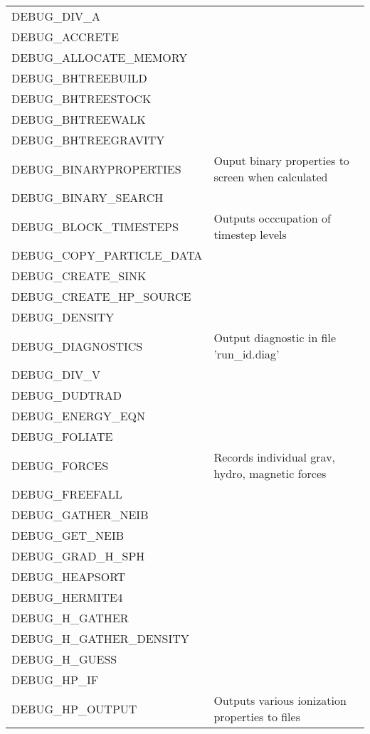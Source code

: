 \documentclass[a4paper]{article}
\begin{document}
\begin{center}
\begin{supertabular}{|p{6cm}|p{8cm}|}
DEBUG\_DIV\_A               & \\
DEBUG\_ACCRETE              & \\
DEBUG\_ALLOCATE\_MEMORY     & \\
DEBUG\_BHTREEBUILD          & \\
DEBUG\_BHTREESTOCK          & \\
DEBUG\_BHTREEWALK           & \\
DEBUG\_BHTREEGRAVITY        & \\
DEBUG\_BINARYPROPERTIES     & Ouput binary properties to screen when calculated \\
DEBUG\_BINARY\_SEARCH       & \\
DEBUG\_BLOCK\_TIMESTEPS     & Outputs occcupation of timestep levels \\
DEBUG\_COPY\_PARTICLE\_DATA & \\
DEBUG\_CREATE\_SINK         & \\
DEBUG\_CREATE\_HP\_SOURCE   & \\
DEBUG\_DENSITY              & \\
DEBUG\_DIAGNOSTICS          & Output diagnostic in file 'run\_id.diag'\\
DEBUG\_DIV\_V               & \\
DEBUG\_DUDTRAD              & \\
DEBUG\_ENERGY\_EQN          & \\
DEBUG\_FOLIATE              & \\
DEBUG\_FORCES               & Records individual grav, hydro, magnetic forces\\
DEBUG\_FREEFALL             & \\
DEBUG\_GATHER\_NEIB         & \\
DEBUG\_GET\_NEIB            & \\
DEBUG\_GRAD\_H\_SPH         & \\
DEBUG\_HEAPSORT             & \\
DEBUG\_HERMITE4             & \\
DEBUG\_H\_GATHER            & \\
DEBUG\_H\_GATHER\_DENSITY   & \\
DEBUG\_H\_GUESS             & \\
DEBUG\_HP\_IF               & \\
DEBUG\_HP\_OUTPUT           & Outputs various ionization properties to files \\

\end{supertabular}
\end{center}
\end{document}
